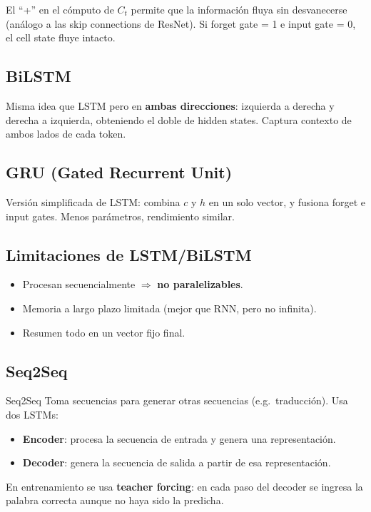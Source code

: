 \documentclass[12pt, a4paper]{article}
\begin{document}
El ``+'' en el cómputo de $C_t$ permite que la información fluya sin desvanecerse (análogo a las skip connections de ResNet). Si forget gate = 1 e input gate = 0, el cell state fluye intacto.

\subsection{BiLSTM}

Misma idea que LSTM pero en \textbf{ambas direcciones}: izquierda a derecha y derecha a izquierda, obteniendo el doble de hidden states. Captura contexto de ambos lados de cada token.

\subsection{GRU (Gated Recurrent Unit)}

Versión simplificada de LSTM: combina $c$ y $h$ en un solo vector, y fusiona forget e input gates. Menos parámetros, rendimiento similar.

\subsection{Limitaciones de LSTM/BiLSTM}

\begin{itemize}
	\item Procesan secuencialmente $\Rightarrow$ \textbf{no paralelizables}.
	\item Memoria a largo plazo limitada (mejor que RNN, pero no infinita).
	\item Resumen todo en un vector fijo final.
\end{itemize}

\subsection{Seq2Seq}

\begin{defbox}{Seq2Seq}
	Toma secuencias para generar otras secuencias (e.g.\ traducción). Usa dos LSTMs:
	\begin{itemize}
		\item \textbf{Encoder}: procesa la secuencia de entrada y genera una representación.
		\item \textbf{Decoder}: genera la secuencia de salida a partir de esa representación.
	\end{itemize}
	En entrenamiento se usa \textbf{teacher forcing}: en cada paso del decoder se ingresa la palabra correcta aunque no haya sido la predicha.
\end{defbox}
\end{document}
